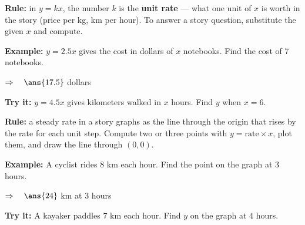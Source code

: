 \documentclass[12pt]{article}
\begin{document}

\begin{formulabox}
\textbf{Rule:} in $y = kx$, the number $k$ is the \textbf{unit rate} --- what
one unit of $x$ is worth in the story (price per kg, km per hour). To answer a
story question, substitute the given $x$ and compute.
\end{formulabox}

\begin{examplebox}
\textbf{Example:} \quad $y = 2.5x$ gives the cost in dollars of $x$ notebooks.
Find the cost of $7$ notebooks.

$\Rightarrow\quad \ans{17.5}$ dollars
\end{examplebox}

\begin{tryitbox}
\textbf{Try it:} \quad $y = 4.5x$ gives kilometers walked in $x$ hours. Find
$y$ when $x = 6$.\\[2pt]
\end{tryitbox}


\begin{formulabox}
\textbf{Rule:} a steady rate in a story graphs as the line through the origin
that rises by the rate for each unit step. Compute two or three points with
$y = \text{rate} \times x$, plot them, and draw the line through $(0, 0)$.
\end{formulabox}

\begin{examplebox}
\textbf{Example:} \quad A cyclist rides $8$ km each hour. Find the point on the
graph at $3$ hours.

$\Rightarrow\quad \ans{24}$ km at $3$ hours
\end{examplebox}

\begin{tryitbox}
\textbf{Try it:} \quad A kayaker paddles $7$ km each hour. Find $y$ on the
graph at $4$ hours.\\[2pt]
\end{tryitbox}
\end{document}
